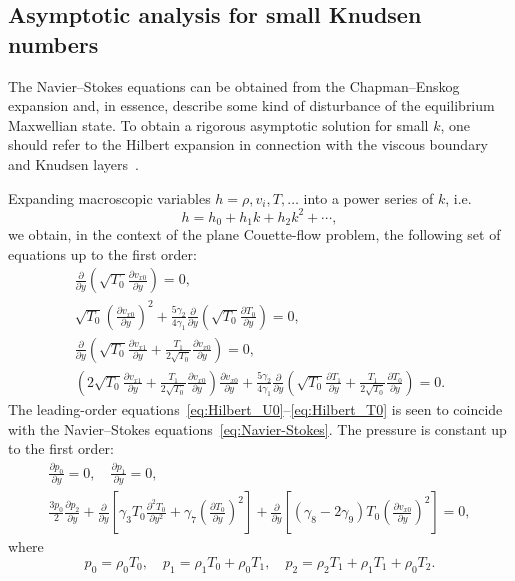 \documentclass[final]{jfm} %
\newcommand{\pder}[2][]{\frac{\partial#1}{\partial#2}}
\newcommand{\pderdual}[2][]{\frac{\partial^2#1}{\partial#2^2}}
\begin{document}
\subsection{Asymptotic analysis for small Knudsen numbers}

The Navier--Stokes equations can be obtained from the Chapman--Enskog expansion
and, in essence, describe some kind of disturbance of the equilibrium Maxwellian state.
To obtain a rigorous asymptotic solution for small \(k\),
one should refer to the Hilbert expansion in connection with the
viscous boundary and Knudsen layers~\citep{Sone2000, Sone2002}.

Expanding macroscopic variables \(h = \rho, v_i, T, \dots\) into a power series of \(k\), i.e.
\begin{equation}\label{eq:hilbert_expansion}
    h = h_0 + h_1k + h_2k^2 + \cdots,
\end{equation}
we obtain, in the context of the plane Couette-flow problem, the following set of equations up to the first order:
\begin{gather}
    \pder{y}\left( \sqrt{T_0}\pder[v_{x0}]{y} \right) = 0, \label{eq:Hilbert_U0}\\
    \sqrt{T_0}\left( \pder[v_{x0}]{y}\right)^2 + \frac{5\gamma_2}{4\gamma_1}\pder{y}\left(\sqrt{T_0}\pder[T_0]{y} \right) = 0, \label{eq:Hilbert_T0}\\
    \pder{y}\left( \sqrt{T_0}\pder[v_{x1}]{y} + \frac{T_1}{2\sqrt{T_0}}\pder[v_{x0}]{y} \right) = 0, \label{eq:Hilbert_U1}\\
    \left( 2\sqrt{T_0}\pder[v_{x1}]{y} + \frac{T_1}{2\sqrt{T_0}}\pder[v_{x0}]{y} \right) \pder[v_{x0}]{y}
        + \frac{5\gamma_2}{4\gamma_1} \pder{y}\left( \sqrt{T_0}\pder[T_1]{y} + \frac{T_1}{2\sqrt{T_0}}\pder[T_0]{y} \right) = 0. \label{eq:Hilbert_T1}
\end{gather}
The leading-order equations~\eqref{eq:Hilbert_U0}--\eqref{eq:Hilbert_T0}
is seen to coincide with the Navier--Stokes equations~\eqref{eq:Navier-Stokes}.
The pressure is constant up to the first order:
\begin{gather}
    \pder[p_0]{y} = 0, \quad \pder[p_1]{y} = 0, \label{eq:hilbert_p0_p1} \\
    \frac{3p_0}{2}\pder[p_2]{y}
        + \pder{y}\left[ \gamma_3 T_0 \pderdual[T_0]{y} + \gamma_7\left(\pder[T_0]{y}\right)^2 \right]
        + \pder{y}\left[ (\gamma_8-2\gamma_9)T_0\left(\pder[v_{x0}]{y}\right)^2 \right] = 0, \label{eq:hilbert_p2}
\end{gather}
where
\begin{equation}\label{eq:hilbert_expansion_p}
    p_0 = \rho_0 T_0, \quad
    p_1 = \rho_1 T_0 + \rho_0 T_1, \quad
    p_2 = \rho_2 T_1 + \rho_1 T_1 + \rho_0 T_2.
\end{equation}
\end{document}

